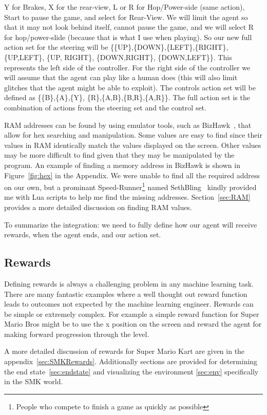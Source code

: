 Y for Brakes, X for the rear-view, L or R for Hop/Power-side (same action), 
Start to pause the game, and select for Rear-View. We will limit the agent
so that it may not look behind itself, cannot pause the game, and we will select
R for hop/power-slide (because that is what I use when playing). So our new full
action set for the steering will be \{\{UP\},\{DOWN\},\{LEFT\},\{RIGHT\},
\{UP,LEFT\}, \{UP, RIGHT\}, \{DOWN,RIGHT\}, \{DOWN,LEFT\}\}. 
This represents the left side of the controller. For the right side of the 
controller we will assume that the agent can play like a human does 
(this will also limit glitches that the agent might be able to exploit). 
The controls action set will be defined as \{\{B\},\{A\},\{Y\},
\{R\},\{A,B\},\{B,R\},\{A,R\}\}. The full action set is the combination of 
actions from the steering set and the control set. 

RAM addresses can be found by using emulator tools, such as BizHawk~\cite{BH}, 
that allow for hex searching and manipulation. Some values are easy to find 
since their values in RAM identically match the values displayed on the screen.
Other values may be more difficult to find given that they may be manipulated
by the program. An example of finding a memory address in BizHawk is shown in
Figure~\ref{fig:hex} in the Appendix. We were unable to find all the required
address on our own, but a prominant Speed-Runner\footnote{People who compete
to finish a game as quickly as possible} named SethBling~\cite{SethBling} 
kindly provided me with Lua scripts to help me find the missing addresses.
Section~\ref{sec:RAM} provides a more detailed discussion on finding RAM values.

To summarize the integration: we need to fully define how our agent will receive
rewards, when the agent ends, and our action set.

\subsection{Rewards}
Defining rewards is always a challenging problem in any machine learning task. 
There are many fantastic examples where a well thought out reward function leads
to outcomes not expected by the machine learning engineer. Rewards can be 
simple or extremely complex. For example a simple reward function for Super
Mario Bros might be to use the x position on the screen and reward the agent
for making forward progression through the level. 

A more detailed discussion of rewards for Super Mario Kart are given in the
appendix~\ref{sec:SMKRewards}. Additionally sections are provided for 
determining the end state~\ref{sec:endstate} and visualizing the environment
\ref{sec:env} specifically in the SMK world.

